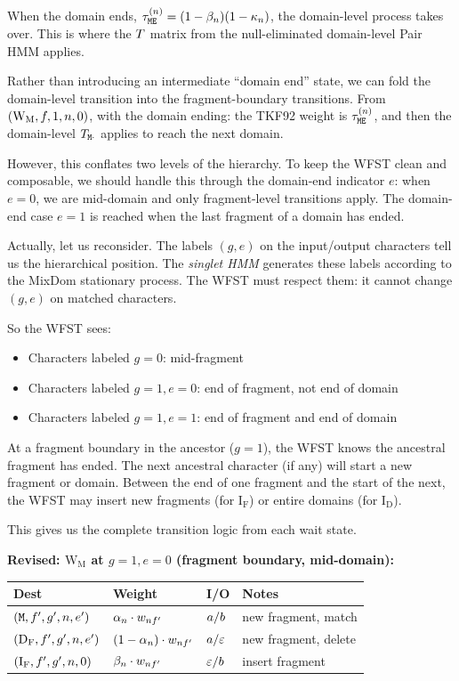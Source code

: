 When the domain ends, $\tau^{(n)}_{{\tt M}{\tt E}} = (1-\beta_n)(1-\kappa_n)$, the
domain-level process takes over.
This is where the $T$ matrix from the null-eliminated domain-level
Pair HMM applies.

Rather than introducing an intermediate ``domain end'' state, we can fold the
domain-level transition into the fragment-boundary transitions.
From $(\mathrm{W_M}, f, 1, n, 0)$, with the domain ending:
the TKF92 weight is $\tau^{(n)}_{{\tt M}{\tt E}}$, and then the domain-level
$T_{{\tt M}\cdot}$ applies to reach the next domain.

However, this conflates two levels of the hierarchy.
To keep the WFST clean and composable, we should handle this through the
domain-end indicator $e$: when $e=0$, we are mid-domain and only fragment-level
transitions apply.  The domain-end case $e=1$ is reached when the last fragment
of a domain has ended.

Actually, let us reconsider.
The labels $(g, e)$ on the input/output characters tell us the hierarchical position.
The \emph{singlet HMM} generates these labels according to the MixDom stationary process.
The WFST must respect them: it cannot change $(g, e)$ on matched characters.

So the WFST sees:
\begin{itemize}
\item Characters labeled $g=0$: mid-fragment
\item Characters labeled $g=1, e=0$: end of fragment, not end of domain
\item Characters labeled $g=1, e=1$: end of fragment and end of domain
\end{itemize}

At a fragment boundary in the ancestor ($g=1$), the WFST knows the ancestral fragment
has ended. The next ancestral character (if any) will start a new fragment or domain.
Between the end of one fragment and the start of the next, the WFST may insert
new fragments (for $\mathrm{I_F}$) or entire domains (for $\mathrm{I_D}$).

This gives us the complete transition logic from each wait state.

\bigskip
\noindent\textbf{Revised: $\mathrm{W_M}$ at $g=1, e=0$ (fragment boundary, mid-domain):}

\begin{center}
\renewcommand{\arraystretch}{1.4}
\begin{tabular}{llll}
\hline
Dest & Weight & I/O & Notes \\
\hline
$({\tt M}, f', g', n, e')$ &
  $\alpha_n \cdot w_{nf'}$ &
  $a / b$ &
  new fragment, match \\
$(\mathrm{D_F}, f', g', n, e')$ &
  $(1-\alpha_n) \cdot w_{nf'}$ &
  $a / \varepsilon$ &
  new fragment, delete \\
$(\mathrm{I_F}, f', g', n, 0)$ &
  $\beta_n \cdot w_{nf'}$ &
  $\varepsilon / b$ &
  insert fragment \\
\hline
\end{tabular}
\end{center}

